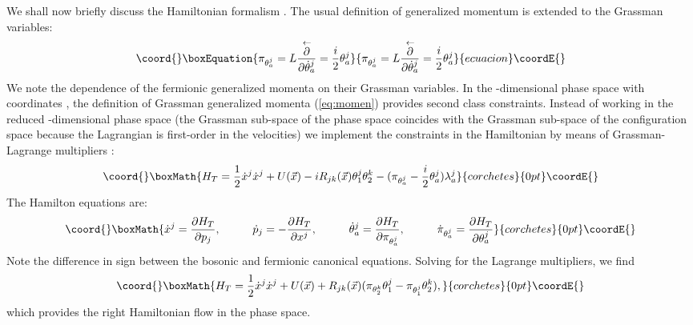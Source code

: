 \documentclass[a4paper,11pt,twoside]{article}
\begin{document}
We shall now briefly discuss the Hamiltonian formalism \cite{Ju}.
The usual definition of generalized momentum is extended to the
Grassman variables:
\begin{equation}\coord{}\boxEquation{
\pi_{\theta_a^j}= L
\frac{\stackrel{\leftarrow}{\partial}}{\partial \dot{\theta}_a^j}=
\frac{i}{2} \theta_a^j
\label{eq:momen}
}{
\pi_{\theta_a^j}= L
\frac{\stackrel{\leftarrow}{\partial}}{\partial \dot{\theta}_a^j}=
\frac{i}{2} \theta_a^j
}{ecuacion}\coordE{}\end{equation}
We note the dependence of the fermionic generalized momenta on
their Grassman variables. In the \coordHE{}-dimensional phase space
\coordHE{} with coordinates \coordHE{}, the definition of Grassman
generalized momenta (\ref{eq:momen}) provides \coordHE{} second class
constraints. Instead of working in the reduced \coordHE{}-dimensional
phase space (the Grassman sub-space of the phase space coincides
with the Grassman sub-space of the configuration space because the
Lagrangian is first-order in the velocities) we implement the
constraints in the Hamiltonian by means of Grassman-Lagrange
multipliers \cite{Di}:
\[\coord{}\boxMath{
H_T=\displaystyle\frac{1}{2} \dot{x}^j \dot{x}^j +U(\vec{x})- i
R_{jk}(\vec{x}) \theta^j_1
\theta^k_2-(\pi_{\theta_a^j}-\displaystyle\frac{i}{2}
\theta_a^j) \lambda_a^j
}{corchetes}{0pt}\coordE{}\]
The Hamilton equations are:
\[\coord{}\boxMath{
\dot{x}^j=\displaystyle\frac{\partial H_T}{\partial p_j}, \hspace{1cm} \dot{p}_j=-\displaystyle\frac{\partial H_T}{\partial x^j}, \hspace{1cm}  \dot{\theta}_a^j=\displaystyle\frac{\partial
H_T}{\partial \displaystyle\pi_{\theta_a^j}},
\hspace{1cm}
\dot{\pi}_{\theta_a^j}=\displaystyle\frac{\partial H_T}{\partial
\theta_a^j}
}{corchetes}{0pt}\coordE{}\]
Note the difference in sign between the bosonic and fermionic
canonical equations. Solving for the Lagrange multipliers, we find
\[\coord{}\boxMath{
H_T=\frac{1}{2} \dot{x}^j \dot{x}^j +U(\vec{x})+ R_{jk}(\vec{x})
(\pi_{\theta_2^k} \theta_1^j-\pi_{\theta_1^j} \theta_2^k) ,
}{corchetes}{0pt}\coordE{}\]
which provides the right Hamiltonian flow in the phase space.
\end{document}
